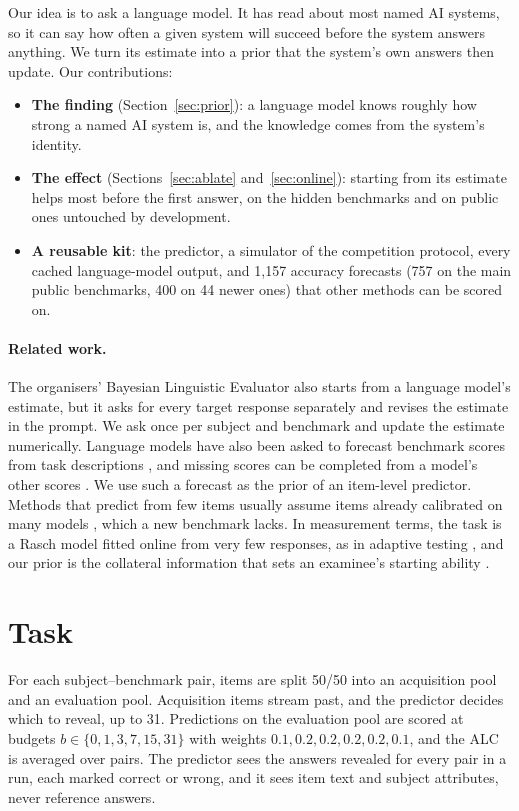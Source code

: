 \documentclass{article}
\begin{document}
Our idea is to ask a language model. It has read about most named AI systems, so it can say how often a given system will succeed before the system answers anything. We turn its estimate into a prior that the system's own answers then update. Our contributions:
\begin{itemize}
\item \textbf{The finding} (Section~\ref{sec:prior}): a language model knows roughly how strong a named AI system is, and the knowledge comes from the system's identity.
\item \textbf{The effect} (Sections~\ref{sec:ablate} and~\ref{sec:online}): starting from its estimate helps most before the first answer, on the hidden benchmarks and on public ones untouched by development.
\item \textbf{A reusable kit}: the predictor, a simulator of the competition protocol, every cached language-model output, and 1,157 accuracy forecasts (757 on the main public benchmarks, 400 on 44 newer ones) that other methods can be scored on.
\end{itemize}

\paragraph{Related work.} The organisers' Bayesian Linguistic Evaluator also starts from a language model's estimate, but it asks for every target response separately and revises the estimate in the prompt. We ask once per subject and benchmark and update the estimate numerically. Language models have also been asked to forecast benchmark scores from task descriptions \cite{park2025}, and missing scores can be completed from a model's other scores \cite{zeng2026}. We use such a forecast as the prior of an item-level predictor. Methods that predict from few items usually assume items already calibrated on many models \cite{polo2024tiny,hofmann2025,vivek2023,truong2025}, which a new benchmark lacks. In measurement terms, the task is a Rasch model \cite{rasch1960,lord1980} fitted online from very few responses, as in adaptive testing \cite{vanderlinden2010}, and our prior is the collateral information that sets an examinee's starting ability \cite{mislevy1987}.

\section{Task}
\label{sec:task}

For each subject--benchmark pair, items are split 50/50 into an acquisition pool and an evaluation pool. Acquisition items stream past, and the predictor decides which to reveal, up to 31. Predictions on the evaluation pool are scored at budgets $b \in \{0,1,3,7,15,31\}$ with weights $0.1, 0.2, 0.2, 0.2, 0.2, 0.1$, and the ALC is averaged over pairs. The predictor sees the answers revealed for every pair in a run, each marked correct or wrong, and it sees item text and subject attributes, never reference answers.
\end{document}
